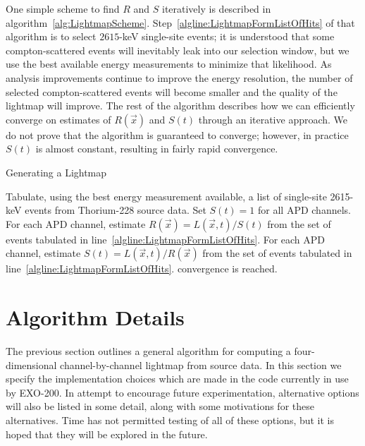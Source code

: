 One simple scheme to find $R$ and $S$ iteratively is described in algorithm~\ref{alg:LightmapScheme}.  Step~\ref{algline:LightmapFormListOfHits} of that algorithm is to select $2615$-keV single-site events; it is understood that some compton-scattered events will inevitably leak into our selection window, but we use the best available energy measurements to minimize that likelihood. As analysis improvements continue to improve the energy resolution, the number of selected compton-scattered events will become smaller and the quality of the lightmap will improve.  The rest of the algorithm describes how we can efficiently converge on estimates of $R(\vec{x})$ and $S(t)$ through an iterative approach.  We do not prove that the algorithm is guaranteed to converge; however, in practice $S(t)$ is almost constant, resulting in fairly rapid convergence.

\begin{algorithm}
\caption{Generating a Lightmap}
\label{alg:LightmapScheme}
\begin{algorithmic}[1]
\STATE Tabulate, using the best energy measurement available, a list of single-site 2615-keV events from Thorium-228 source data. \label{algline:LightmapFormListOfHits}
\STATE Set $S(t) = 1$ for all APD channels.
\REPEAT
  \STATE For each APD channel, estimate $R(\vec{x}) = L(\vec{x},t)/S(t)$ from the set of events tabulated in line~\ref{algline:LightmapFormListOfHits}.
  \STATE For each APD channel, estimate $S(t) = L(\vec{x},t)/R(\vec{x})$ from the set of events tabulated in line~\ref{algline:LightmapFormListOfHits}.
\UNTIL convergence is reached.
\end{algorithmic}
\end{algorithm}


\section{Algorithm Details}

The previous section outlines a general algorithm for computing a four-dimensional channel-by-channel lightmap from source data.  In this section we specify the implementation choices which are made in the code currently in use by EXO-200.  In attempt to encourage future experimentation, alternative options will also be listed in some detail, along with some motivations for these alternatives.  Time has not permitted testing of all of these options, but it is hoped that they will be explored in the future.

